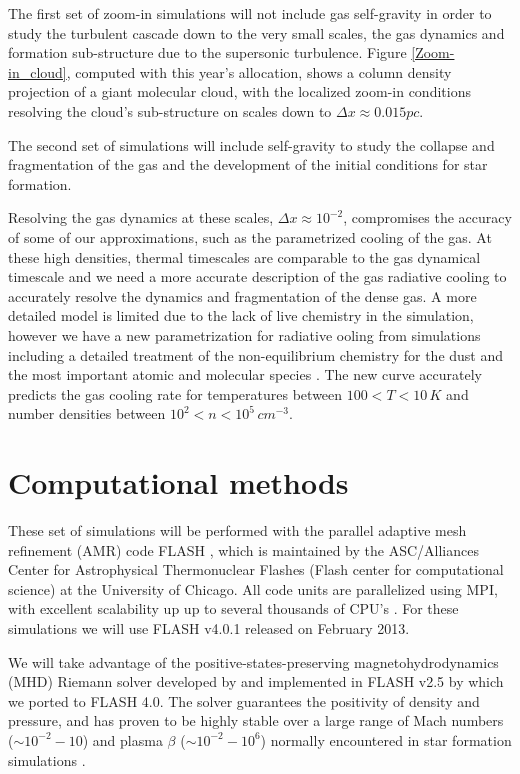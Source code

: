 \documentclass[12pt,a4paper]{article}
\begin{document}
The first set of zoom-in simulations will not include gas self-gravity in order to study the turbulent cascade down to the very small scales, the gas dynamics and formation sub-structure due to the supersonic turbulence.
Figure \ref{Zoom-in_cloud}, computed with this year's allocation, shows a column density projection of a giant molecular cloud, with the localized zoom-in conditions resolving the cloud's sub-structure on scales down to $\Delta x \approx 0.015 pc$.
	
The second set of simulations will include self-gravity to study the collapse and fragmentation of the gas and the development of the initial conditions for star formation.
	
Resolving the gas dynamics at these scales, $\Delta x \approx 10^{-2}$, compromises the accuracy of some of our approximations, such as the parametrized cooling of the gas. 
At these high densities, thermal timescales are comparable to the gas dynamical timescale and we need a more accurate description of the gas radiative cooling to accurately resolve the dynamics and fragmentation of the dense gas.
A more detailed model is limited due to the lack of live chemistry in the simulation, however we have a new parametrization for radiative  ooling from simulations including a detailed treatment of the non-equilibrium chemistry for the dust and the most important atomic and molecular species \citep{Gover&MacLow2007, Glover2010}.
The new curve accurately predicts the gas cooling rate for temperatures between $100 < T < 10 \, K$ and number densities between $10^2 < n < 10^5 \, cm^{-3}$.
		 
		
	
\section{Computational methods}
	
These set of simulations will be performed with the parallel adaptive mesh refinement (AMR) code FLASH \citep{Flash}, which is maintained by the ASC/Alliances Center for Astrophysical Thermonuclear Flashes (Flash center for computational science) at the University of Chicago.
All code units are parallelized using MPI, with excellent scalability up up to several thousands of CPU's \citep{Dubey2008, FlashPerformance}.
For these simulations we will use FLASH v4.0.1 released on February 2013.
	
 We will take advantage of the positive-states-preserving magnetohydrodynamics (MHD) Riemann solver developed by \citet{Bouchout2010} and implemented in FLASH v2.5 by \citet{Waagan2011} which we ported to FLASH 4.0.
The solver guarantees the positivity of density and pressure, and has proven to be highly stable over a large range of Mach numbers ($\sim 10^{-2} - 10$) and plasma $\beta$ ($\sim 10^{-2} - 10^{6}$) normally encountered in star formation simulations \citep{JoungMacLow2006,Joung2009, Hill2012}.
\end{document}
